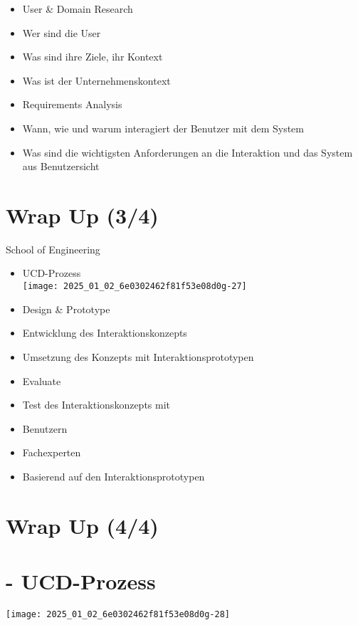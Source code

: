 \documentclass[10pt]{article}
\begin{document}
\begin{itemize}
  \item User \& Domain Research
  \item Wer sind die User
  \item Was sind ihre Ziele, ihr Kontext
  \item Was ist der Unternehmenskontext
  \item Requirements Analysis
  \item Wann, wie und warum interagiert der Benutzer mit dem System
  \item Was sind die wichtigsten Anforderungen an die Interaktion und das System aus Benutzersicht
\end{itemize}

\section*{Wrap Up (3/4)}
School of Engineering

\begin{itemize}
  \item UCD-Prozess\\
\texttt{[image: 2025\_01\_02\_6e0302462f81f53e08d0g-27]}
  \item Design \& Prototype
  \item Entwicklung des Interaktionskonzepts
  \item Umsetzung des Konzepts mit Interaktionsprototypen
  \item Evaluate
  \item Test des Interaktionskonzepts mit
  \item Benutzern
  \item Fachexperten
  \item Basierend auf den Interaktionsprototypen
\end{itemize}

\section*{Wrap Up (4/4)}
\section*{- UCD-Prozess}
\begin{center}
\texttt{[image: 2025\_01\_02\_6e0302462f81f53e08d0g-28]}
\end{center}
\end{document}
